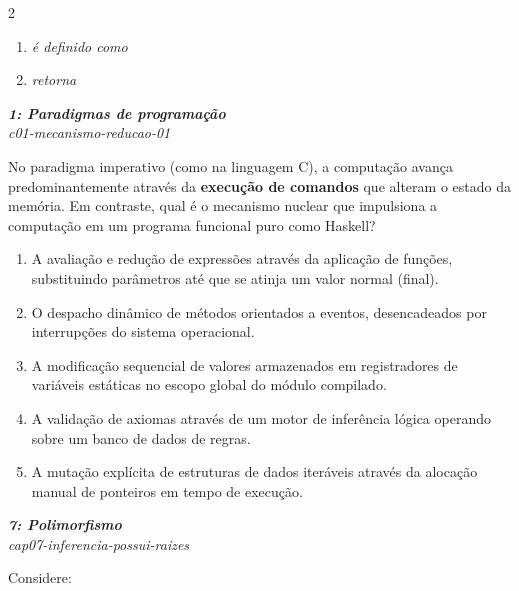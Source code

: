 \documentclass[a4paper,10pt,brazil]{article}
\begin{document}
\begin{multicols}{2}
\begin{enumerate}
  \item \emph{é definido como}

  \item \emph{retorna}


\end{enumerate}

\begin{flushright}
  \footnotesize
  \textit{\textbf{1: Paradigmas de programação}}\\
  \textit{c01-mecanismo-reducao-01}\\

\end{flushright}
No paradigma imperativo (como na linguagem C), a computação avança predominantemente através da \textbf{execução de comandos} que alteram o estado da memória. Em contraste, qual é o mecanismo nuclear que impulsiona a computação em um programa funcional puro como Haskell?

\begin{enumerate}
  \item A avaliação e redução de expressões através da aplicação de funções, substituindo parâmetros até que se atinja um valor normal (final).

  \item O despacho dinâmico de métodos orientados a eventos, desencadeados por interrupções do sistema operacional.

  \item A modificação sequencial de valores armazenados em registradores de variáveis estáticas no escopo global do módulo compilado.

  \item A validação de axiomas através de um motor de inferência lógica operando sobre um banco de dados de regras.

  \item A mutação explícita de estruturas de dados iteráveis através da alocação manual de ponteiros em tempo de execução.


\end{enumerate}

\begin{flushright}
  \footnotesize
  \textit{\textbf{7: Polimorfismo}}\\
  \textit{cap07-inferencia-possui-raizes}\\

\end{flushright}
Considere:


\end{multicols}
\end{document}
